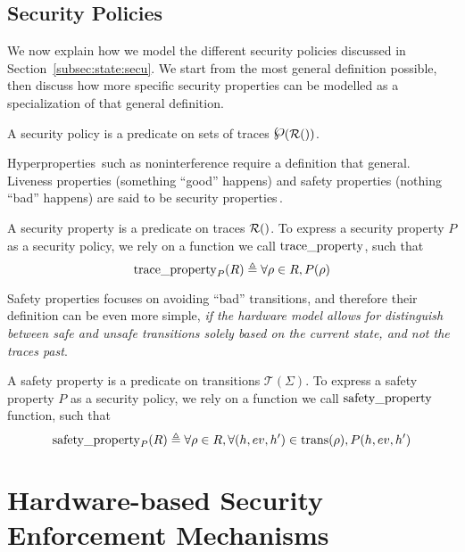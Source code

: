 \subsection{Security Policies}
\label{subsec:speccert:security}

We now explain how we model the different security policies discussed in
Section~\ref{subsec:state:secu}.
%
We start from the most general definition possible, then discuss how more
specific security properties can be modelled as a specialization of that general
definition.

\begin{definition}
  A security policy is a predicate on sets of traces
  $\powerset(\pathesLTS{Ez})$.
\end{definition}

Hyperproperties\,\cite{clarkson2010hyperproperties} such as noninterference
require a definition that general.
%
Liveness properties (something ``good'' happens) and safety properties (nothing
``bad'' happens) are said to be security
properties\,\cite{schneider2000enforceable}.

\begin{definition}
  A security property is a predicate on traces $\pathesLTS{Ez}$.
  To express a security property $P$ as a security policy, we rely on a function
  we call $\mathrm{trace\_property}$, such that
  \[
    \mathrm{trace\_property}_{P}(R) \triangleq \forall \rho \in R, P(\rho)
  \]
\end{definition}

Safety properties focuses on avoiding ``bad'' transitions, and therefore their
definition can be even more simple, \emph{if the hardware model allows for
  distinguish between safe and unsafe transitions solely based on the current
  state, and not the traces past}.

\begin{definition}
  A safety property is a predicate on transitions $\mathcal{T}(\Sigma)$.
  To express a safety property $P$ as a security policy, we rely on a function
  we call $\mathrm{safety\_property}$ function, such that
  \[
    \mathrm{safety\_property}_{P}(R) \triangleq \forall \rho \in R, \forall (h,
    ev, h') \in \mathrm{trans}(\rho), P(h, ev, h')
  \]
\end{definition}

\section{Hardware-based Security Enforcement Mechanisms}
\label{sec:speccert:hse}

